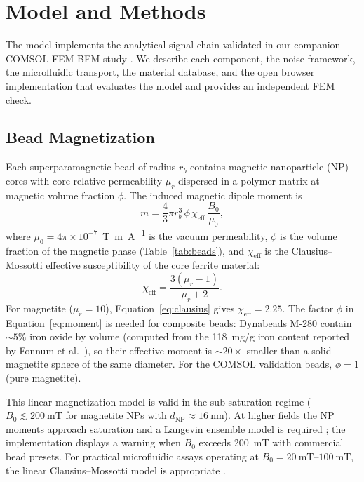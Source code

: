 \documentclass[micromachines,article,submit,pdftex,moreauthors]{Definitions/mdpi}
\begin{document}
\section{Model and Methods}
\label{sec:model}

The model implements the analytical signal chain validated in our companion
COMSOL FEM-BEM study \cite{govindaraju2025}. We describe each component, the noise
framework, the microfluidic transport, the material database, and the open browser
implementation that evaluates the model and provides an independent FEM check.

\subsection{Bead Magnetization}
\label{sec:magnetization}

Each superparamagnetic bead of radius $r_b$ contains magnetic nanoparticle (NP)
cores with core relative permeability $\mu_r$ dispersed in a polymer matrix at
magnetic volume fraction $\phi$. The induced magnetic dipole moment is
\begin{equation}
m = \frac{4}{3}\pi r_b^3 \, \phi \, \chi_{\text{eff}} \, \frac{B_0}{\mu_0},
\label{eq:moment}
\end{equation}
where $\mu_0 = 4\pi \times 10^{-7}$~\si{\tesla\meter\per\ampere} is the vacuum
permeability, $\phi$ is the volume fraction of the magnetic phase
(Table~\ref{tab:beads}), and $\chi_{\text{eff}}$ is the Clausius--Mossotti effective
susceptibility of the core ferrite material:
\begin{equation}
\chi_{\text{eff}} = \frac{3(\mu_r - 1)}{\mu_r + 2}.
\label{eq:clausius}
\end{equation}
For magnetite ($\mu_r = 10$), Equation~\eqref{eq:clausius} gives
$\chi_{\text{eff}} = 2.25$. The factor $\phi$ in Equation~\eqref{eq:moment} is
needed for composite beads: Dynabeads M-280 contain ${\sim}5\%$ iron oxide by
volume (computed from the \SI{118}{mg/g} iron content reported by Fonnum et al.\
\cite{fonnum2005}), so their effective moment is ${\sim}20\times$ smaller than a
solid magnetite sphere of the same diameter. For the COMSOL validation beads,
$\phi = 1$ (pure magnetite).

This linear magnetization model is valid in the sub-saturation regime
($B_0 \lesssim \SI{200}{\milli\tesla}$ for magnetite NPs with
$d_\text{NP} \approx \SI{16}{\nano\meter}$). At higher fields the NP moments
approach saturation and a Langevin ensemble model is required
\cite{elfimova2019,henrard2019}; the implementation displays a warning when
$B_0$ exceeds \SI{200}{\milli\tesla} with commercial bead presets. For practical
microfluidic assays operating at $B_0 = \SIrange{20}{100}{\milli\tesla}$, the
linear Clausius--Mossotti model is appropriate \cite{ota2019}.
\end{document}
